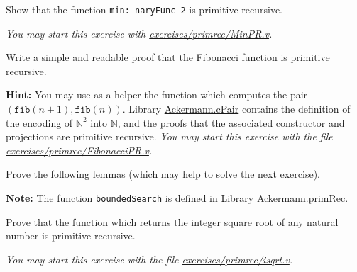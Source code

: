 \begin{exercise}
Show that the function \texttt{min: naryFunc\,2} is primitive
recursive.

\emph{You may start this exercise with
    \href{https://https://github.com/coq-community/hydra-battles/blob/master/exercises/primrec/MinPR.v}{exercises/primrec/MinPR.v}.}

\end{exercise}


\begin{exercise}
Write a simple and readable proof that the Fibonacci function is primitive recursive.




\textbf{Hint:}  You may use as a helper the function which computes the pair \linebreak
$(\texttt{fib}(n+1),\texttt{fib}(n))$. 
Library \href{../theories/html/hydras.Ackermann.cPair.html}{Ackermann.cPair} contains
the definition of the encoding of $\mathbb{N}^2$ into $\mathbb{N}$, and the proofs that 
the associated constructor and projections are primitive recursive.
\emph{You may start this exercise with the file
    \href{https://github.com/coq-community/hydra-battles/blob/master/exercises/primrec/FibonacciPR.v}{exercises/primrec/FibonacciPR.v}.}

\end{exercise}

\begin{exercise}

Prove the following lemmas (which may help to solve the next  exercise).




\textbf{Note:}  The function \texttt{boundedSearch} is defined
in Library \href{../theories/html/hydras.Ackermann.primRec.html}{Ackermann.primRec}. 
\end{exercise}


\begin{exercise}
Prove that the function which returns the  integer square root of any natural number  is primitive recursive.

\emph{You may start this exercise with the file
    \href{https://github.com/coq-community/hydra-battles/blob/master/exercises/primrec/isqrt.v}{exercises/primrec/isqrt.v}.}

\end{exercise}

